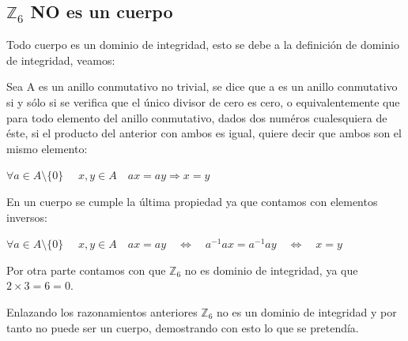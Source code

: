 \documentclass{article}
\theoremstyle{theorem-style}  %
\theoremstyle{definition-style}
\theoremstyle{example-style}
\begin{document}
\subsection{ $\mathds{Z}_6 $ NO es un cuerpo}

Todo cuerpo es un dominio de integridad, esto se debe a la definición de dominio de integridad, veamos: 

Sea A es un anillo conmutativo no trivial, se dice que a es un anillo conmutativo si y sólo si se verifica que el único divisor de cero es cero, o equivalentemente que para todo elemento del anillo conmutativo, dados dos numéros cualesquiera de éste, si el producto del anterior con ambos es igual, quiere decir que ambos son el mismo elemento:

$ \forall a \in A \setminus \{0\} $  $ 	\quad x,y \in A \quad ax = ay \Rightarrow x = y$

En un cuerpo se cumple la última propiedad ya que contamos con elementos inversos: 

$ \forall a \in A \setminus \{0\} $  $ 	\quad x,y \in A \quad ax = ay \quad \Leftrightarrow \quad a^{-1}ax = a^{-1}ay  \quad \Leftrightarrow \quad x = y$

Por otra parte contamos con que $\mathds{Z}_6 $ no es dominio de integridad, ya que $2 \times 3 = 6 = 0$.

Enlazando los razonamientos anteriores $\mathds{Z}_6 $ no es un dominio de integridad y por tanto no puede ser un cuerpo, demostrando con esto lo que se pretendía. 







\newpage
\end{document}
